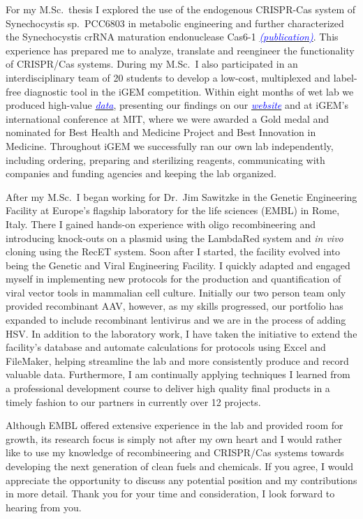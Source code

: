 \documentclass[11pt,a4paper,sans]{moderncv}
\begin{document}
\begin{spacing}{1.2}
For my M.Sc.\ thesis I explored the use of the endogenous CRISPR-Cas system of Synechocystis sp.\ PCC6803 in metabolic engineering and further characterized the Synechocystis crRNA maturation endonuclease Cas6-1 {\href{https://www.tandfonline.com/eprint/vmAQ3vjYGdZIZpIKQTIT/full}{\textcolor{blue}{\textit{(publication)}}}}.
This experience has prepared me to analyze, translate and reengineer the functionality of CRISPR/Cas systems. 
During my M.Sc.\ I also participated in an interdisciplinary team of 20 students to develop a low-cost, multiplexed and label-free diagnostic tool in the iGEM competition.
Within eight months of wet lab we produced high-value {\href{https://www.ncbi.nlm.nih.gov/pubmed/29803867}{\textcolor{blue}{\textit{data}}}}, presenting our findings on our 
{\href{http://2015.igem.org/Team:Freiburg/Home_Intro}{\textcolor{blue}{\textit{website}}}} and at iGEM's international conference at MIT, where we were awarded a Gold medal and nominated for Best Health and Medicine Project and Best Innovation in Medicine.
Throughout iGEM we successfully ran our own lab independently, including ordering, preparing and sterilizing reagents, communicating with companies and funding agencies and keeping the lab organized. \par
\vspace*{1.5mm}
After my M.Sc.\ I began working for Dr.\ Jim Sawitzke in the Genetic Engineering Facility at Europe's flagship laboratory for the life sciences (EMBL) in Rome, Italy. 
There I gained hands-on experience with oligo recombineering and introducing knock-outs on a plasmid using the LambdaRed system and \textit{in vivo} cloning using the RecET system.
Soon after I started, the facility evolved into being the Genetic and Viral Engineering Facility. 
I quickly adapted and engaged myself in implementing new protocols for the production and quantification of viral vector tools in mammalian cell culture. 	
Initially our two person team only provided recombinant AAV, however, as my skills progressed, our portfolio has expanded to include recombinant lentivirus and we are in the process of adding HSV.
In addition to the laboratory work, I have taken the initiative to extend the facility's database and automate calculations for protocols using Excel and FileMaker, helping streamline the lab and more consistently produce and record valuable data. 
Furthermore, I am continually applying techniques I learned from a professional development course to deliver high quality final products in a timely fashion to our partners in currently over 12 projects.\par%
\vspace*{1.5mm}
Although EMBL offered extensive experience in the lab and provided room for growth, its research focus is simply not after my own heart and I would rather like to use my knowledge of recombineering and CRISPR/Cas systems towards developing the next generation of clean fuels and chemicals.
If you agree, I would appreciate the opportunity to discuss any potential position and my contributions in more detail. 
Thank you for your time and consideration, I look forward to hearing from you.

\end{spacing}
\vspace*{2mm} 
\makeletterclosing
\end{document}

